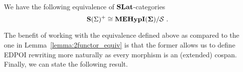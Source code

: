 

\begin{theorem}
	\label{thm:completeness_simple}
	We have the following equivalence of $\mathbf{SLat}$-categories
	\vspace{-2mm}
	\[
		\catname{S}(\Sigma)^{+} \cong \WellTypedMdaEcospans / \mathcal{S}~.
	\vspace{-1mm}
	\]	
	\end{theorem}
\vspace{-2mm}
The benefit of working with the equivalence defined above as compared to the one in Lemma~\ref{lemma:2functor_equiv} is that the former allows us to define EDPOI rewriting more naturally as every morphism is an (extended) cospan.
Finally, we can state the following result.



